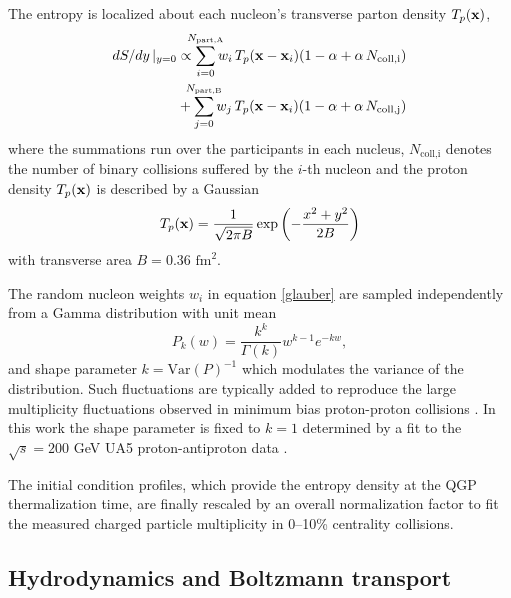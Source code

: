 \documentclass[aps,prc,reprint,amsmath,nofootinbib,superscriptaddress]{revtex4-1}
\begin{document}
The entropy is localized about each nucleon's transverse parton density $T_p({\bf x})$,
\begin{align}
 dS/dy \,\vert_{y=0} &\propto \smashoperator{\sum_{i=0}^{N_\text{part,A}}} w_i\, T_p({\bf x} - {\bf x}_i)(1-\alpha + \alpha\, N_\text{coll,i}) \nonumber \\
                     &+ \smashoperator{\sum_{j=0}^{N_\text{part,B}}} w_j\, T_p({\bf x} - {\bf x}_i)(1-\alpha + \alpha\, N_\text{coll,j})
 \label{glauber}
\end{align}
where the summations run over the participants in each nucleus, $N_\text{coll,i}$ denotes the number of binary collisions suffered by the $i$-th nucleon 
and the proton density $T_p({\bf x})$ is described by a Gaussian
\begin{equation}
 T_p({\bf x}) = \frac{1}{\sqrt{2 \pi B}} \exp \left(-\frac{x^2+y^2}{2 B} \right)
\end{equation}
with transverse area $B = 0.36$ $\text{fm}^2$.

The random nucleon weights $w_i$ in equation \eqref{glauber} are sampled independently from a Gamma distribution with unit mean
\begin{equation}
 P_k(w) = \frac{k^k}{\Gamma(k)} w^{k-1} e^{-k w},
\end{equation}
and shape parameter $k = \text{Var}(P)^{-1}$ which modulates the variance of the distribution. 
Such fluctuations are typically added to reproduce the large multiplicity fluctuations observed in minimum bias proton-proton collisions \cite{Adare:2008ns, Dumitru:2012yr, Moreland:2012qw, Bozek:2013uha, Shen:2014sfi}. 
In this work the shape parameter is fixed to $k=1$ determined by a fit to the $\sqrt{s}=200$ GeV UA5 proton-antiproton data \cite{Ansorge:1988kn}. 

The initial condition profiles, which provide the entropy density at the QGP thermalization time, are finally rescaled by an overall normalization factor to fit the measured charged particle multiplicity in 0--10\% centrality collisions.

\subsection{Hydrodynamics and Boltzmann transport}
\end{document}
